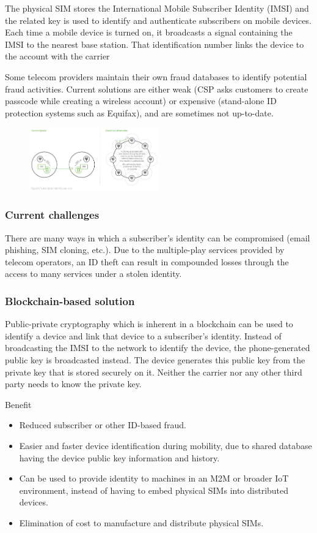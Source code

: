 \documentclass[12pt]{article}
\begin{document}
\noindent The physical SIM stores the International
Mobile Subscriber Identity (IMSI) and the
related key is used to identify and authenticate subscribers on mobile devices.
Each time a mobile device is turned on, it
broadcasts a signal containing the IMSI to
the nearest base station. That identification
number links the device to the account with
the carrier

\noindent Some telecom providers maintain their
own fraud databases to identify potential
fraud activities. Current solutions are either weak (CSP asks customers to create passcode while creating a wireless account) or
expensive (stand-alone ID protection
systems such as Equifax), and are sometimes not up-to-date. 
\begin{figure}[!h]
	\centering
	\includegraphics[width=0.5\textwidth]{fig6.jpg}
\end{figure}
\subsubsection{Current challenges}
There are many ways
in which a subscriber’s identity can be compromised (email phishing, SIM cloning, etc.).
Due to the multiple-play services provided
by telecom operators, an ID theft can result
in compounded losses through the access
to many services under a stolen identity.


\subsubsection{Blockchain-based solution}

Public-private cryptography
which is inherent in a blockchain
can be used to identify a device and link
that device to a subscriber’s identity.
Instead of broadcasting the IMSI to the network to identify the device, the phone-generated public key is broadcasted instead.
The device generates this public key from
the private key that is stored securely on
it. Neither the carrier nor any other third
party needs to know the private key.

\rightboxbegin
Benefit
\begin{itemize}
	\item Reduced subscriber or other ID-based
	fraud. 
	\item Easier and faster device identification during mobility, due to shared
	database having the device public
	key information and history.
	\item Can be used to provide identity to
	machines in an M2M or broader
	IoT environment, instead of having to embed physical SIMs into
	distributed devices.
	\item Elimination of cost to manufacture
	and distribute physical SIMs.
\end{itemize}
\rightboxend
\end{document}
